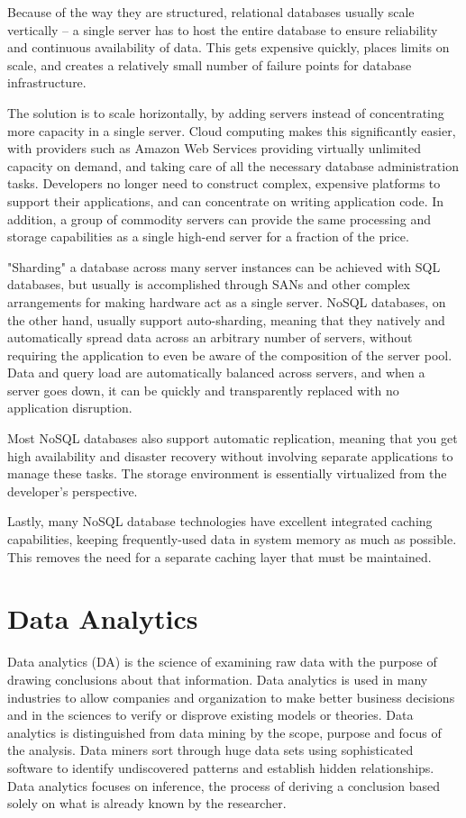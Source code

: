 \documentclass[12pt]{article}
\begin{document}
Because of the way they are structured, relational databases usually scale vertically – a single server has to host the entire database to ensure reliability and continuous availability of data. This gets expensive quickly, places limits on scale, and creates a relatively small number of failure points for database infrastructure.

The solution is to scale horizontally, by adding servers instead of concentrating more capacity in a single server. Cloud computing makes this significantly easier, with providers such as Amazon Web Services providing virtually unlimited capacity on demand, and taking care of all the necessary database administration tasks. Developers no longer need to construct complex, expensive platforms to support their applications, and can concentrate on writing application code. In addition, a group of commodity servers can provide the same processing and storage capabilities as a single high-end server for a fraction of the price.

"Sharding" a database across many server instances can be achieved with SQL databases, but usually is accomplished through SANs and other complex arrangements for making hardware act as a single server. NoSQL databases, on the other hand, usually support auto-sharding, meaning that they natively and automatically spread data across an arbitrary number of servers, without requiring the application to even be aware of the composition of the server pool. Data and query load are automatically balanced across servers, and when a server goes down, it can be quickly and transparently replaced with no application disruption.

Most NoSQL databases also support automatic replication, meaning that you get high availability and disaster recovery without involving separate applications to manage these tasks. The storage environment is essentially virtualized from the developer's perspective.

Lastly, many NoSQL database technologies have excellent integrated caching capabilities, keeping frequently-used data in system memory as much as possible. This removes the need for a separate caching layer that must be maintained.

\section{Data Analytics}
Data analytics (DA) is the science of examining raw data with the purpose of drawing conclusions about that information. Data analytics is used in many industries to allow companies and organization to make better business decisions and in the sciences to verify or disprove existing models or theories. Data analytics is distinguished from data mining by the scope, purpose and focus of the analysis. Data miners sort through huge data sets using sophisticated software to identify undiscovered patterns and establish hidden relationships. Data analytics focuses on inference, the process of deriving a conclusion based solely on what is already known by the researcher.
\end{document}
